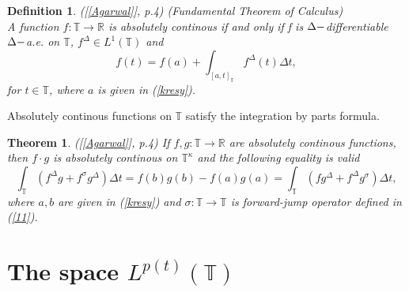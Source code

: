 \documentclass[12pt,a4paper,oneside,titlepage]{article}
\newtheorem{Twierdzenie}{Theorem}
\newtheorem{Def}{Definition}
\begin{document}
\begin{Def}([\ref{Agarwal}], p.4) \textit{(Fundamental Theorem of Calculus)}  \\ A function $f: \mathbb{T} \rightarrow \mathbb{R}$ is absolutely continous if and only if f is $\Delta \-- $differentiable $\Delta \-- $a.e. on $\mathbb{T}$, $f^{\Delta} \in L^1(\mathbb{T})$ and
\begin{equation}
\nonumber
f(t)=f(a) + \int_{[a,t]_{\mathbb{T}}} f^{\Delta}(t) \Delta t, 
\end{equation}
for $t \in \mathbb{T} $, where $a$ is given in (\ref{kresy}).
\end{Def}
Absolutely continous functions on $\mathbb{T}$ satisfy the integration by parts formula.
\begin{Twierdzenie}  ([\ref{Agarwal}], p.4) If $f,g:\mathbb{T} \rightarrow \mathbb{R}$ are absolutely continous functions, then $f \cdot g$ is absolutely continous on $\mathbb{T}^{\kappa}$ and the following equality is valid
\begin{equation}
\nonumber
\int_{\mathbb{T}}  \left( f^{\Delta}g + f^{\sigma} g^{\Delta} \right) \Delta t = f(b) g(b) - f(a) g(a) = 
\int_{\mathbb{T}}  \left( fg^{\Delta} + f^{\Delta} g^{\sigma} \right) \Delta t,
\end{equation}
where $a,b$ are given in (\ref{kresy}) and $\sigma: \mathbb{T} \rightarrow \mathbb{T}$ is forward-jump operator defined in (\ref{11}).
\end{Twierdzenie}

\section{The space $L^{p(t)}(\mathbb{T})$ }
\end{document}

